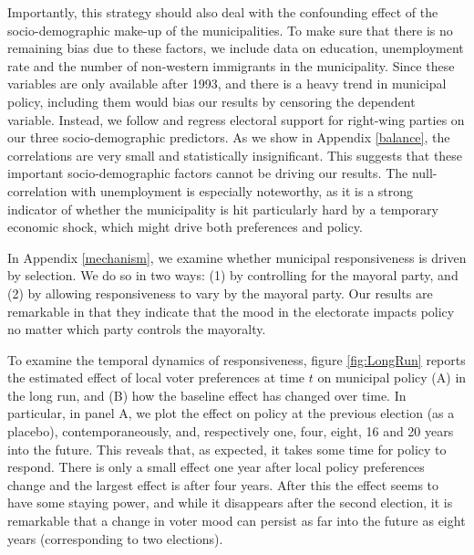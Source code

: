 \documentclass[a4paper,12pt]{article}
\begin{document}
Importantly, this strategy should also deal with the confounding effect of the socio-demographic make-up of the municipalities. To make sure that there is no remaining bias due to these factors, we include data on education, unemployment rate and the number of non-western immigrants in the municipality. Since these variables are only available after 1993, and there is a heavy trend in municipal policy, including them would bias our results by censoring the dependent variable. Instead, we follow \citep{pei2018poorly} and regress electoral support for right-wing parties on our three socio-demographic predictors. As we show in Appendix \ref{balance}, the correlations are very small and statistically insignificant. This suggests that these important socio-demographic factors cannot be driving our results. The null-correlation with unemployment is especially noteworthy, as it is a strong indicator of whether the municipality is hit particularly hard by a temporary economic shock, which might drive both preferences and policy.

In Appendix \ref{mechanism}, we examine whether municipal responsiveness is driven by selection. We do so in two ways: (1) by controlling for the mayoral party, and (2) by allowing responsiveness to vary by the mayoral party. Our results are remarkable in that they indicate that the mood in the electorate impacts policy no matter which party controls the mayoralty.

To examine the temporal dynamics of responsiveness, figure \ref{fig:LongRun} reports the estimated effect of local voter preferences at time $t$ on municipal policy (A) in the long run, and (B) how the baseline effect has changed over time. In particular, in panel A, we plot the effect on policy at the previous election (as a placebo), contemporaneously, and, respectively one, four, eight, 16 and 20 years into the future. This reveals that, as expected, it takes some time for policy to respond. There is only a small effect one year after local policy preferences change and the largest effect is  after four years. After this the effect seems to have some staying power, and while it disappears after the second election, it is remarkable that a change in voter mood can persist as far into the future as eight years (corresponding to two elections).
\end{document}
